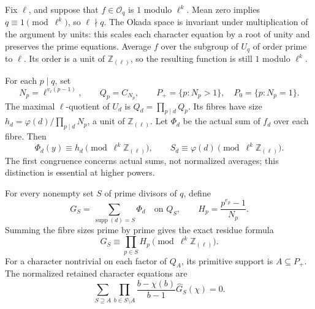 \documentclass[11pt]{article}
\newcommand{\Rl}{\mathbb Z_{(\ell)}}
\newcommand{\supp}{\operatorname{supp}}
\newcommand{\OO}{\mathcal O}
\begin{document}
Fix $\ell$, and suppose that $f\in\OO_q$ is $1$ modulo $\ell^k$. Mean zero implies $q\equiv1\pmod{\ell^k}$, so $\ell\nmid q$. The Okada space is invariant under multiplication of the argument by units: this scales each character equation by a root of unity and preserves the prime equations. Average $f$ over the subgroup of $U_q$ of order prime to $\ell$. Its order is a unit of $\Rl$, so the resulting function is still $1$ modulo $\ell^k$.

For each $p\mid q$, set
\[
 N_p=\ell^{v_\ell(p-1)},\qquad Q_p=C_{N_p},\qquad
 P_+=\{p:N_p>1\},\quad P_0=\{p:N_p=1\}.
\]
The maximal $\ell$-quotient of $U_d$ is $Q_d=\prod_{p\mid d}Q_p$. Its fibres have size $h_d=\varphi(d)/\prod_{p\mid d}N_p$, a unit of $\Rl$. Let $\Phi_d$ be the actual sum of $f_d$ over each fibre. Then
\begin{equation}\label{eq:fiberres}
 \Phi_d(y)\equiv h_d\pmod{\ell^k\Rl},\qquad
 S_d\equiv\varphi(d)\pmod{\ell^k\Rl}.
\end{equation}
The first congruence concerns actual sums, not normalized averages; this distinction is essential at higher powers.

For every nonempty set $S$ of prime divisors of $q$, define
\[
 G_S=\sum_{\supp(d)=S}\Phi_d\quad\text{on }Q_S,
 \qquad H_p=\frac{p^{e_p}-1}{N_p}.
\]
Summing the fibre sizes prime by prime gives the exact residue formula
\begin{equation}\label{eq:GSres}
 G_S\equiv\prod_{p\in S}H_p\pmod{\ell^k\Rl}.
\end{equation}
For a character nontrivial on each factor of $Q_A$, its primitive support is $A\subseteq P_+$. The normalized retained character equations are
\begin{equation}\label{eq:compressedA}
 \sum_{S\supseteq A}\prod_{b\in S\setminus A}\frac{b-\chi(b)}{b-1}
 \widehat G_S(\chi)=0.
\end{equation}
\end{document}
